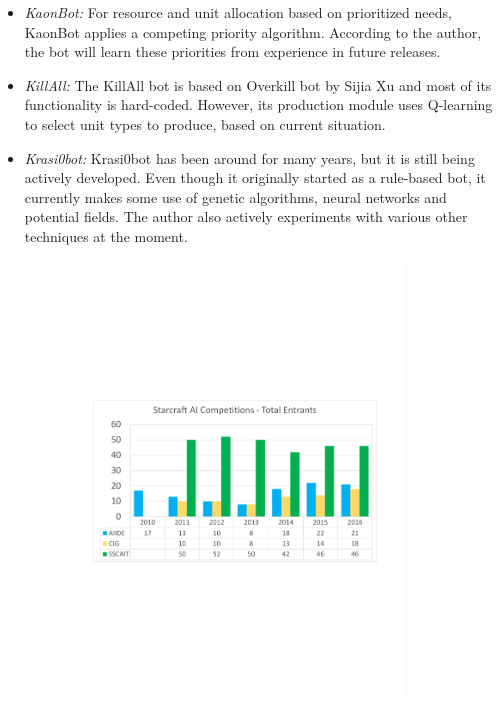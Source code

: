 \begin{itemize}
  \item {\em KaonBot:} For resource and unit allocation based on prioritized needs, KaonBot applies a competing priority algorithm. According to the author, the bot will learn these priorities from experience in future releases.
  
  \item {\em KillAll:} The KillAll bot is based on Overkill bot by Sijia Xu and most of its functionality is hard-coded. However, its production module uses Q-learning to select unit types to produce, based on current situation. 
    
  \item {\em Krasi0bot:} Krasi0bot has been around for many years, but it is still being actively developed. Even though it originally started as a rule-based bot, it currently makes some use of genetic algorithms, neural networks and potential fields. The author also actively experiments with various other techniques at the moment.
  \begin{figure}[t]
  \begin{center}
  \includegraphics[width=9cm]{fig/Entrants}

\end{center}
\end{figure}
\end{itemize}
